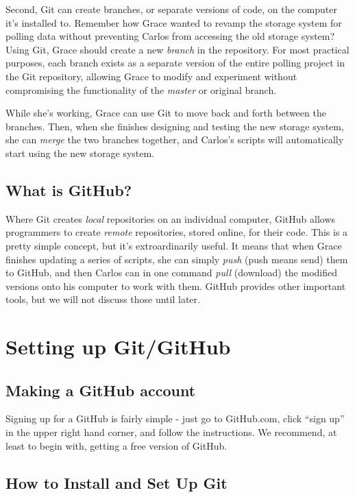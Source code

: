 \documentclass[]{book}
\begin{document}
Second, Git can create branches, or separate versions of code, on the
computer it's installed to. Remember how Grace wanted to revamp the
storage system for polling data without preventing Carlos from accessing
the old storage system? Using Git, Grace should create a new
\emph{branch} in the repository. For most practical purposes, each
branch exists as a separate version of the entire polling project in the
Git repository, allowing Grace to modify and experiment without
compromising the functionality of the \emph{master} or original branch.

While she's working, Grace can use Git to move back and forth between
the branches. Then, when she finishes designing and testing the new
storage system, she can \emph{merge} the two branches together, and
Carlos's scripts will automatically start using the new storage system.

\subsection{What is GitHub?}\label{what-is-github}

Where Git creates \emph{local} repositories on an individual computer,
GitHub allows programmers to create \emph{remote} repositories, stored
online, for their code. This is a pretty simple concept, but it's
extroardinarily useful. It means that when Grace finishes updating a
series of scripts, she can simply \emph{push} (push means send) them to
GitHub, and then Carlos can in one command \emph{pull} (download) the
modified versions onto his computer to work with them. GitHub provides
other important tools, but we will not discuss those until later.

\section{Setting up Git/GitHub}\label{setting-up-gitgithub}

\subsection{Making a GitHub account}\label{making-a-github-account}

Signing up for a GitHub is fairly simple - just go to GitHub.com, click
``sign up'' in the upper right hand corner, and follow the instructions.
We recommend, at least to begin with, getting a free version of GitHub.

\subsection{How to Install and Set Up
Git}\label{how-to-install-and-set-up-git}
\end{document}
